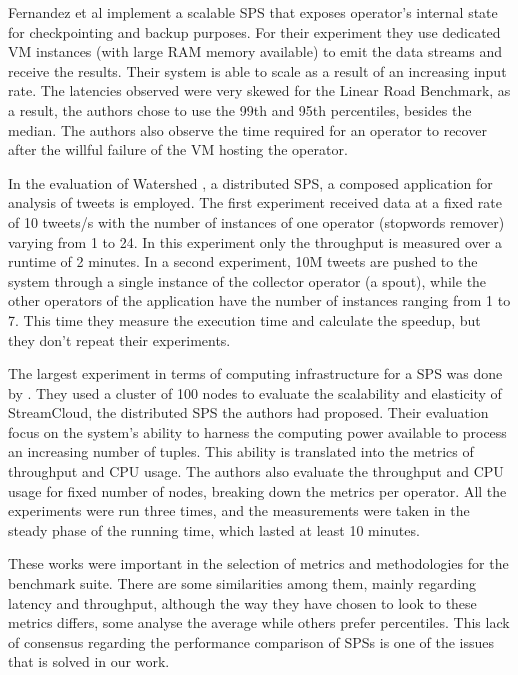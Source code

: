 \documentclass[ppgc,diss,english]{iiufrgs}
\begin{document}
Fernandez et al \cite{castro2013integrating} implement a scalable SPS that exposes operator's internal state for checkpointing and backup purposes. For their experiment they use dedicated VM instances (with large RAM memory available) to emit the data streams and receive the results. Their system is able to scale as a result of an increasing input rate. The latencies observed were very skewed for the Linear Road Benchmark, as a result, the authors chose to use the 99th and 95th percentiles, besides the median. The authors also observe the time required for an operator to recover after the willful failure of the VM hosting the operator.

In the evaluation of Watershed \cite{de2011watershed}, a distributed SPS, a composed application for analysis of tweets is employed. The first experiment received data at a fixed rate of 10 tweets/s with the number of instances of one operator (stopwords remover) varying from 1 to 24. In this experiment only the throughput is measured over a runtime of 2 minutes. In a second experiment, 10M tweets are pushed to the system through a single instance of the collector operator (a spout), while the other operators of the application have the number of instances ranging from 1 to 7. This time they measure the execution time and calculate the speedup, but they don't repeat their experiments.

The largest experiment in terms of computing infrastructure for a SPS was done by \cite{gulisano2012streamcloud}. They used a cluster of 100 nodes to evaluate the scalability and elasticity of StreamCloud, the distributed SPS the authors had proposed. Their evaluation focus on the system's ability to harness the computing power available to process an increasing number of tuples. This ability is translated into the metrics of throughput and CPU usage. The authors also evaluate the throughput and CPU usage for fixed number of nodes, breaking down the metrics per operator. All the experiments were run three times, and the measurements were taken in the steady phase of the running time, which lasted at least 10 minutes.

These works were important in the selection of metrics and methodologies for the benchmark suite. There are some similarities among them, mainly regarding latency and throughput, although the way they have chosen to look to these metrics differs, some analyse the average while others prefer percentiles. This lack of consensus regarding the performance comparison of SPSs is one of the issues that is solved in our work.
\end{document}
